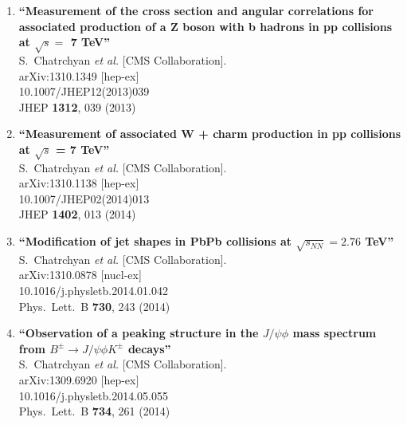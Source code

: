 \documentclass{article}
\begin{document}
\begin{enumerate}
\item%
{\bf ``Measurement of the cross section and angular correlations for associated production of a Z boson with b hadrons in pp collisions at $\sqrt{s} =$ 7 TeV''}
  \\{}S.~Chatrchyan {\it et al.}  [CMS Collaboration].
  \\{}arXiv:1310.1349 [hep-ex]
    \\{}10.1007/JHEP12(2013)039
\\{}JHEP {\bf 1312}, 039 (2013) %


\item%
{\bf ``Measurement of associated W + charm production in pp collisions at $\sqrt{s}$ = 7 TeV''}
  \\{}S.~Chatrchyan {\it et al.}  [CMS Collaboration].
  \\{}arXiv:1310.1138 [hep-ex]
    \\{}10.1007/JHEP02(2014)013
\\{}JHEP {\bf 1402}, 013 (2014) %


\item%
{\bf ``Modification of jet shapes in PbPb collisions at $\sqrt {s_{NN}} = 2.76$ TeV''}
  \\{}S.~Chatrchyan {\it et al.}  [CMS Collaboration].
  \\{}arXiv:1310.0878 [nucl-ex]
    \\{}10.1016/j.physletb.2014.01.042
\\{}Phys.\ Lett.\ B {\bf 730}, 243 (2014) %


\item%
{\bf ``Observation of a peaking structure in the $J/\psi \phi$ mass spectrum from $B^{\pm} \to J/\psi \phi K^{\pm}$ decays''}
  \\{}S.~Chatrchyan {\it et al.}  [CMS Collaboration].
  \\{}arXiv:1309.6920 [hep-ex]
    \\{}10.1016/j.physletb.2014.05.055
\\{}Phys.\ Lett.\ B {\bf 734}, 261 (2014) %



\end{enumerate}
\end{document}
